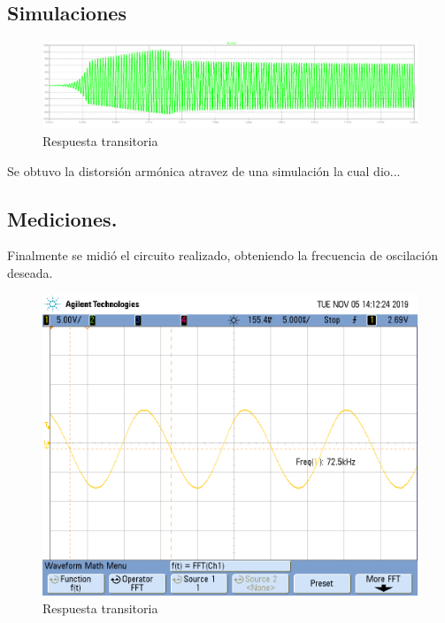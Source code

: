 \subsection{Simulaciones}
\begin{figure}[H]
	\centering
	\includegraphics[width=\textwidth]{Imagenes-Ej1/trans.png}
	\caption{Respuesta transitoria}
	\label{fig:trans}
\end{figure}
Se obtuvo la distorsión armónica atravez de una simulación la cual dio...
\subsection{Mediciones.}
Finalmente se midió el circuito realizado, obteniendo la frecuencia de oscilación deseada.
\begin{figure}[H]
	\centering
	\includegraphics[width=\textwidth]{Imagenes-Ej1/oscilador.png}
	\caption{Respuesta transitoria}
	\label{fig:trans}
\end{figure}

